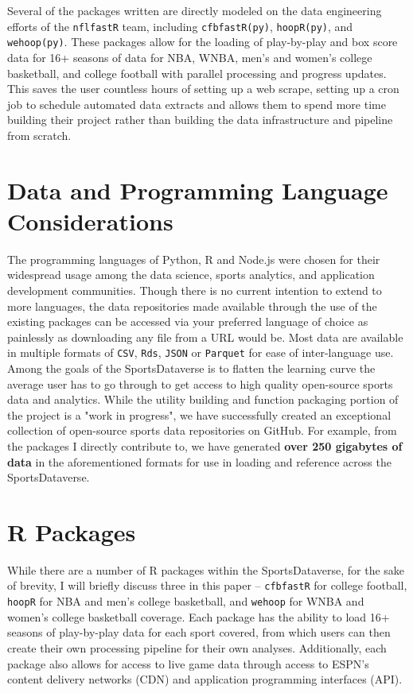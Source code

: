 \documentclass[12pt]{article}
\begin{document}
Several of the packages written are directly modeled on the data engineering efforts of the \texttt{nflfastR} team, including \texttt{cfbfastR(py)}\cite{sgetal2021cfbfastr}\cite{gilani_cfbfastRpy_2021}, \texttt{hoopR(py)}\cite{gilani_hoopRpy_2021}\cite{gilani_cfbfastRpy_2021}, and \texttt{wehoop(py)}. These packages allow for the loading of play-by-play and box score data for 16+ seasons of data for NBA, WNBA, men's and women's college basketball, and college football with parallel processing and progress updates. This saves the user countless hours of setting up a web scrape, setting up a cron job to schedule automated data extracts and allows them to spend more time building their project rather than building the data infrastructure and pipeline from scratch.  

\section{Data and Programming Language Considerations}
The programming languages of Python, R and Node.js were chosen for their widespread usage among the data science, sports analytics, and application development communities. 
Though there is no current intention to extend to more languages, the data repositories made available through the use of the existing packages can be accessed via your preferred language of choice as painlessly as downloading any file from a URL would be. Most data are available in multiple formats of \texttt{CSV}, \texttt{Rds}, \texttt{JSON} or \texttt{Parquet} for ease of inter-language use. Among the goals of the SportsDataverse is to flatten the learning curve the average user has to go through to get access to high quality open-source sports data and analytics. While the utility building and function packaging portion of the project is a "work in progress", we have successfully created an exceptional collection of open-source sports data repositories on GitHub. For example, from the packages I directly contribute to, we have generated \textbf{over 250 gigabytes of data} in the aforementioned formats for use in loading and reference across the SportsDataverse. 

\section{R Packages}
While there are a number of R packages within the SportsDataverse, for the sake of brevity, I will briefly discuss three in this paper -- \texttt{cfbfastR} for college football, \texttt{hoopR} for NBA and men's college basketball, and \texttt{wehoop} for WNBA and women's college basketball coverage. Each package has the ability to load 16+ seasons of play-by-play data for each sport covered, from which users can then create their own processing pipeline for their own analyses. Additionally, each package also allows for access to live game data through access to ESPN's content delivery networks (CDN) and application programming interfaces (API). 
\end{document}
